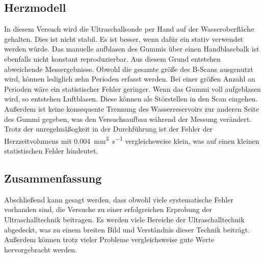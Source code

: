 \subsection{Herzmodell}
In diesem Versuch wird die Ultraschallsonde per Hand auf der Wasseroberfläche gehalten. Dies ist nicht stabil. 
Es ist besser, wenn dafür ein stativ verwendet werden würde. Das manuelle aufblasen des Gummis über einen 
Handblasebalk ist ebenfalls nicht konstant reproduzierbar. Aus diesem Grund entstehen abweichende Messergebnisse. 
Obwohl die gesamte größe des B-Scans ausgenutzt wird, können lediglich zehn Perioden erfasst werden. Bei einer 
größen Anzahl an Perioden wäre ein statistischer Fehler geringer. Wenn das Gummi voll aufgeblasen wird, so 
entstehen Luftblasen. Diese können als Störstellen in den Scan eingehen. Außerdem ist keine konsequente Trennung 
des Wasserreservoirs zur anderen Seite des Gummi gegeben, was den Versuchsaufbau während der Messung verändert. 
Trotz der unregelmäßogkeit in der Durchführung ist der Fehler der Herzzeitvolumens mit 
\qty{0.004}{\cubic\milli\meter\per\second} vergleichsweise klein, was auf einen kleinen statistischen Fehler 
hindeutet.


\subsection{Zusammenfassung}
Abschließend kann gesagt werden, dass obwohl viele systematische Fehler vorhanden sind, die Versuche zu einer 
erfolgreichen Erprobung der Ultraschalltechnik beitragen. Es werden viele Bereiche der Ultraschalltechnik 
abgedeckt, was zu einem breiten Bild und Verständnis dieser Technik beiträgt. Außerdem können trotz vieler 
Probleme vergleichsweise gute Werte hervorgebracht werden.   








